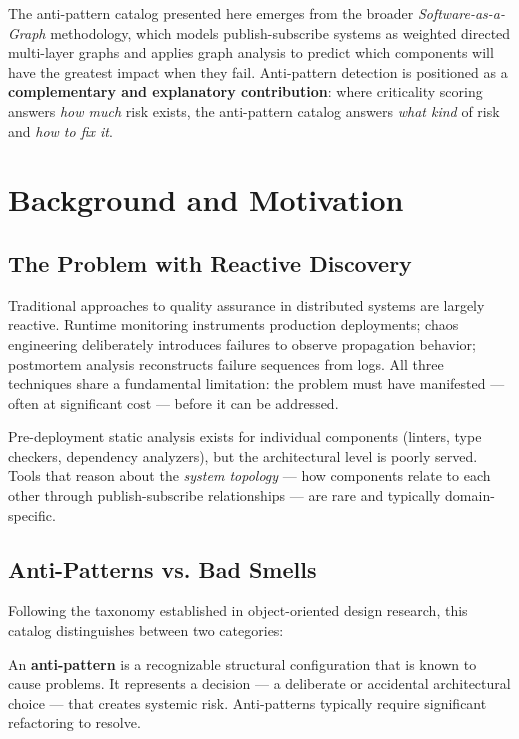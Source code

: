 \documentclass[11pt]{article}
\begin{document}
The anti-pattern catalog presented here emerges from the broader \emph{Software-as-a-Graph} methodology, which models publish-subscribe systems as weighted directed multi-layer graphs and applies graph analysis to predict which components will have the greatest impact when they fail. Anti-pattern detection is positioned as a \textbf{complementary and explanatory contribution}: where criticality scoring answers \emph{how much} risk exists, the anti-pattern catalog answers \emph{what kind} of risk and \emph{how to fix it}.

\section{Background and Motivation}

\subsection{The Problem with Reactive Discovery}

Traditional approaches to quality assurance in distributed systems are largely reactive. Runtime monitoring instruments production deployments; chaos engineering deliberately introduces failures to observe propagation behavior; postmortem analysis reconstructs failure sequences from logs. All three techniques share a fundamental limitation: the problem must have manifested --- often at significant cost --- before it can be addressed.

Pre-deployment static analysis exists for individual components (linters, type checkers, dependency analyzers), but the architectural level is poorly served. Tools that reason about the \emph{system topology} --- how components relate to each other through publish-subscribe relationships --- are rare and typically domain-specific.

\subsection{Anti-Patterns vs. Bad Smells}

Following the taxonomy established in object-oriented design research, this catalog distinguishes between two categories:

An \textbf{anti-pattern} is a recognizable structural configuration that is known to cause problems. It represents a decision --- a deliberate or accidental architectural choice --- that creates systemic risk. Anti-patterns typically require significant refactoring to resolve.
\end{document}
